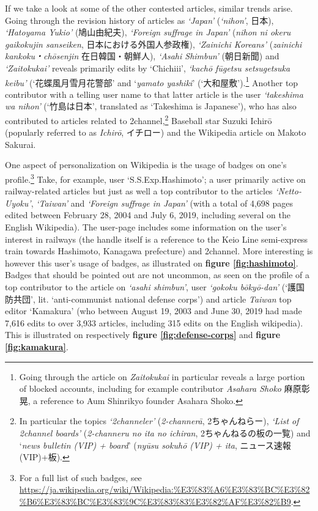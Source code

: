 \documentclass[10pt,british,A4paper,,openany]{memoir}
\begin{document}
If we take a look at some of the other contested articles, similar
trends arise. Going through the revision history of articles as
\emph{`Japan'} (\emph{`nihon'}, 日本), \emph{`Hatoyama Yukio'}
(鳩山由紀夫), \emph{`Foreign suffrage in Japan'} (\emph{nihon ni okeru
gaikokujin sanseiken}, 日本における外国人参政権), \emph{`Zainichi
Koreans'} (\emph{zainichi kankoku・chōsenjin} 在日韓国・朝鮮人),
\emph{`Asahi Shimbun'} (朝日新聞) and \emph{`Zaitokukai'} reveals
primarily edits by `Chichiii', \emph{`kachō fūgetsu setsugetsuka keibu'}
(`花蝶風月雪月花警部' and `\emph{yamato yashiki}'
(`大和屋敷').\footnote{Going through the article on \emph{Zaitokukai} in
  particular reveals a large portion of blocked accounts, including for
  example contributor \emph{Asahara Shoko} 麻原彰晃, a reference to Aum
  Shinrikyo founder Asahara Shoko.} Another top contributor with a
telling user name to that latter article is the user \emph{`takeshima wa
nihon'} (`竹島は日本', translated as `Takeshima is Japanese'), who has
also contributed to articles related to 2channel,\footnote{In particular
  the topics \emph{`2channeler'} (\emph{2-channerā}, 2ちゃんねらー),
  \emph{`List of \emph{2channel} boards'} (\emph{2-channeru no ita no
  ichiran}, 2ちゃんねるの板の一覧) and `\emph{news bulletin (VIP) +
  board}' (\emph{nyūsu sokuhō (VIP) + ita}, ニュース速報(VIP)+板).}
Baseball star Suzuki Ichirō (popularly referred to as \emph{Ichirō},
イチロー) and the Wikipedia article on Makoto Sakurai.

One aspect of personalization on Wikipedia is the usage of badges on
one's profile.\footnote{For a full list of such badges, see
  \url{https://ja.wikipedia.org/wiki/Wikipedia:\%E3\%83\%A6\%E3\%83\%BC\%E3\%82\%B6\%E3\%83\%BC\%E3\%83\%9C\%E3\%83\%83\%E3\%82\%AF\%E3\%82\%B9}.}
Take, for example, user `S.S.Exp.Hashimoto'; a user primarily active on
railway-related articles but just as well a top contributor to the
articles \emph{`Netto-Uyoku'}, \emph{`Taiwan'} and \emph{`Foreign
suffrage in Japan'} (with a total of 4,698 pages edited between February
28, 2004 and July 6, 2019, including several on the English Wikipedia).
The user-page includes some information on the user's interest in
railways (the handle itself is a reference to the Keio Line semi-express
train towards Hashimoto, Kanagawa prefecture) and 2channel. More
interesting is however this user's usage of badges, as illustrated on
\textbf{figure \ref{fig:hashimoto}}. Badges that should be pointed out
are not uncommon, as seen on the profile of a top contributor to the
article on \emph{`asahi shimbun'}, user \emph{`gokoku bōkyō-dan'}
(`護国防共団', lit. `anti-communist national defense corps') and article
\emph{Taiwan} top editor `Kamakura' (who between August 19, 2003 and
June 30, 2019 had made 7,616 edits to over 3,933 articles, including 315
edits on the English wikipedia). This is illustrated on respectively
\textbf{figure \ref{fig:defense-corps}} and \textbf{figure
\ref{fig:kamakura}}.
\end{document}
